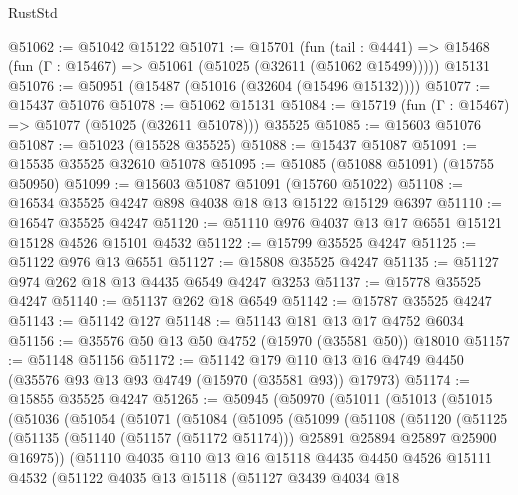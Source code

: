 \begin{lexlean}{RustStd}
\begin{coremodule}
@51062 := @51042 @15122
@51071 := @15701
    (fun (tail : @4441) => @15468 (fun (Γ : @15467) => @51061 (@51025 (@32611 (@51062 @15499)))))
    @15131
@51076 := @50951 (@15487 (@51016 (@32604 (@15496 @15132))))
@51077 := @15437 @51076
@51078 := @51062 @15131
@51084 := @15719 (fun (Γ : @15467) => @51077 (@51025 (@32611 @51078))) @35525
@51085 := @15603 @51076
@51087 := @51023 (@15528 @35525)
@51088 := @15437 @51087
@51091 := @15535 @35525 @32610 @51078
@51095 := @51085 (@51088 @51091) (@15755 @50950)
@51099 := @15603 @51087 @51091 (@15760 @51022)
@51108 := @16534 @35525 @4247 @898 @4038 @18 @13 @15122 @15129 @6397
@51110 := @16547 @35525 @4247
@51120 := @51110 @976 @4037 @13 @17 @6551 @15121 @15128 @4526 @15101 @4532
@51122 := @15799 @35525 @4247
@51125 := @51122 @976 @13 @6551
@51127 := @15808 @35525 @4247
@51135 := @51127 @974 @262 @18 @13 @4435 @6549 @4247 @3253
@51137 := @15778 @35525 @4247
@51140 := @51137 @262 @18 @6549
@51142 := @15787 @35525 @4247
@51143 := @51142 @127
@51148 := @51143 @181 @13 @17 @4752 @6034
@51156 := @35576 @50 @13 @50 @4752 (@15970 (@35581 @50)) @18010
@51157 := @51148 @51156
@51172 := @51142
    @179
    @110
    @13
    @16
    @4749
    @4450
    (@35576 @93 @13 @93 @4749 (@15970 (@35581 @93)) @17973)
@51174 := @15855 @35525 @4247
@51265 := @50945
    (@50970
      (@51011
        (@51013
          (@51015
            (@51036
              (@51054
                (@51071
                  (@51084
                    (@51095
                      (@51099
                        (@51108
                          (@51120
                            (@51125
                              (@51135
                                (@51140 (@51157 (@51172 @51174)))
                                @25891
                                @25894
                                @25897
                                @25900
                                @16975))
                            (@51110
                              @4035
                              @110
                              @13
                              @16
                              @15118
                              @4435
                              @4450
                              @4526
                              @15111
                              @4532
                              (@51122
                                @4035
                                @13
                                @15118
                                (@51127
                                  @3439
                                  @4034
                                  @18

\end{coremodule}
\end{lexlean}
